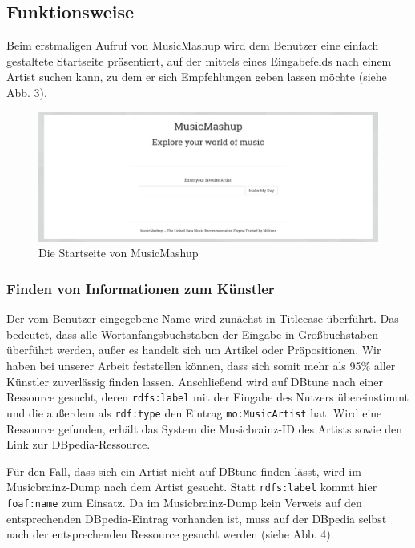 \newpage

\subsection{Funktionsweise}


Beim erstmaligen Aufruf von MusicMashup wird dem Benutzer eine einfach gestaltete Startseite präsentiert, auf der mittels eines Eingabefelds nach einem Artist  suchen kann, zu dem er sich Empfehlungen geben lassen möchte (siehe Abb. 3).

\begin{figure}[ht!]
	\centering
	\includegraphics[width=137mm]{bilder/startseite.png}
	\caption{Die Startseite von MusicMashup \label{overflow}}
\end{figure}

\subsubsection{Finden von Informationen zum Künstler}
Der vom Benutzer eingegebene Name wird zunächst in Titlecase überführt. Das bedeutet, dass alle Wortanfangsbuchstaben der Eingabe in Großbuchstaben überführt werden, außer es handelt sich um Artikel oder Präpositionen. Wir haben bei unserer Arbeit feststellen können, dass sich somit mehr als 95\% aller Künstler zuverlässig finden lassen.
Anschließend wird auf DBtune nach einer Ressource gesucht, deren \texttt{rdfs:label} mit der Eingabe des Nutzers übereinstimmt und die außerdem als \texttt{rdf:type} den Eintrag \texttt{mo:MusicArtist} hat. Wird eine Ressource gefunden, erhält das System die Musicbrainz-ID des Artists sowie den Link zur DBpedia-Ressource.

Für den Fall, dass sich ein Artist nicht auf DBtune finden lässt, wird im Musicbrainz-Dump nach dem Artist gesucht. Statt \texttt{rdfs:label} kommt hier \texttt{foaf:name} zum Einsatz. Da im Musicbrainz-Dump kein Verweis auf den entsprechenden DBpedia-Eintrag vorhanden ist, muss auf der DBpedia selbst nach der entsprechenden Ressource gesucht werden (siehe Abb. 4).

